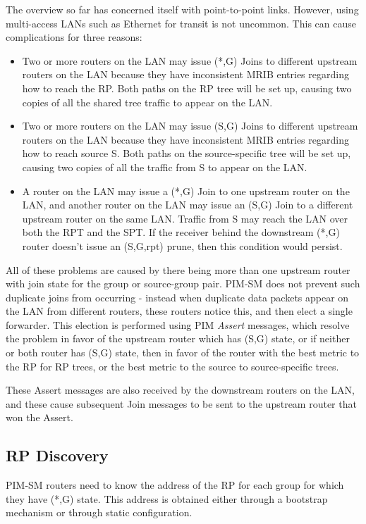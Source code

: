The overview so far has concerned itself with point-to-point links.
However, using multi-access LANs such as Ethernet for transit is not
uncommon.  This can cause complications for three reasons:
\begin{itemize}
\item Two or more routers on the LAN may issue (*,G) Joins to different
upstream routers on the LAN because they have inconsistent MRIB
entries regarding how to reach the RP.  Both paths on the RP tree will
be set up, causing two copies of all the shared tree traffic to appear
on the LAN.
\item Two or more routers on the LAN may issue (S,G) Joins to different
upstream routers on the LAN because they have inconsistent MRIB
entries regarding how to reach source S.  Both paths on the
source-specific tree will be set up, causing two copies of all the
traffic from S to appear on the LAN.
\item A router on the LAN may issue a (*,G) Join to one upstream router on
the LAN, and another router on the LAN may issue an (S,G) Join to a
different upstream router on the same LAN.  Traffic from S may reach
the LAN over both the RPT and the SPT.  If the receiver behind the
downstream (*,G) router doesn't issue an (S,G,rpt) prune, then this
condition would persist.
\end{itemize}
All of these problems are caused by there being more than one upstream
router with join state for the group or source-group pair.  PIM-SM does
not prevent such duplicate joins from occurring - instead when
duplicate data packets appear on the LAN from different routers, these
routers notice this, and then elect a single forwarder.  This election
is performed using PIM {\it Assert} messages, which resolve the problem in
favor of the upstream router which has (S,G) state, or if neither or
both router has (S,G) state, then in favor of the router with the best
metric to the RP for RP trees, or the best metric to the source to
source-specific trees.

These Assert messages are also received by the downstream routers on
the LAN, and these cause subsequent Join messages to be sent to the
upstream router that won the Assert.

\subsection*{RP Discovery}

PIM-SM routers need to know the address of the RP for each group for
which they have (*,G) state.  This address is obtained either through
a bootstrap mechanism or through static configuration.

